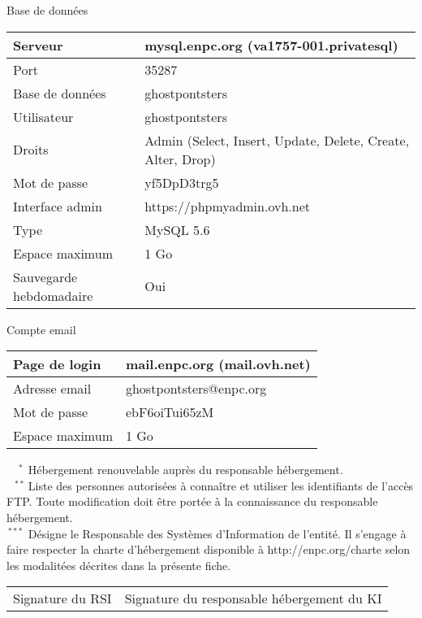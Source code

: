 \documentclass{ki019}
\newenvironment{tableau}[1]{
\LARGE #1\\
\vspace{0.4cm}
\begin{tabular}{|K{5cm}|K{10cm}|}
}
{
\end{tabular}
\vspace{0.5cm}
}
\begin{document}
\begin{center}
\begin{tableau}{Base de données}
\hline
Serveur & mysql.enpc.org (va1757-001.privatesql) \\
\hline
Port & 35287 \\
\hline
Base de données & ghostpontsters \\
\hline
Utilisateur & ghostpontsters \\
\hline
Droits & Admin (Select, Insert, Update, Delete, Create, Alter, Drop) \\
\hline
Mot de passe & yf5DpD3trg5 \\
\hline
Interface admin & https://phpmyadmin.ovh.net \\
\hline
Type & MySQL 5.6 \\
\hline
Espace maximum & 1 Go \\
\hline
Sauvegarde hebdomadaire & Oui \\
\hline
\end{tableau}

\begin{tableau}{Compte email}
\hline
Page de login & mail.enpc.org (mail.ovh.net) \\
\hline
Adresse email & ghostpontsters@enpc.org \\
\hline
Mot de passe & ebF6oiTui65zM \\
\hline
Espace maximum & 1 Go \\
\hline
\end{tableau}

\end{center}

\vspace{-0.5cm}
\noindent
$^{\phantom{**}*}$ Hébergement renouvelable auprès du responsable hébergement.\\
$^{\phantom{*}**}$ Liste des personnes autorisées à connaître et utiliser les identifiants de l'accès FTP. Toute modification 					doit être portée à la connaissance du responsable hébergement.\\
$^{\phantom{}***}$ Désigne le Responsable des Systèmes d'Information de l'entité. Il s'engage à faire respecter la charte 					d'hébergement disponible à http://enpc.org/charte selon les modalitées décrites dans la présente fiche.

\vspace{0.5cm}
\Large
\begin{tabular}{p{6cm}p{9.5cm}}
Signature du RSI & Signature du responsable hébergement du KI
\end{tabular}

\Footer{\today}
\end{document}
